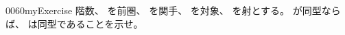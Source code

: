\documentclass[index]{subfiles}
\begin{document}
\begin{myBlock}{0060}{myExercise}
  階数、
  を前圏、
  を関手、
  を対象、
  を射とする。
  が同型ならば、
  は同型であることを示せ。
\end{myBlock}
\end{document}
